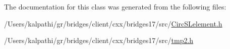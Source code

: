 The documentation for this class was generated from the following files\+:\begin{DoxyCompactItemize}
\item 
/\+Users/kalpathi/gr/bridges/client/cxx/bridges17/src/\mbox{\hyperlink{_circ_s_lelement_8h}{Circ\+S\+Lelement.\+h}}\item 
/\+Users/kalpathi/gr/bridges/client/cxx/bridges17/src/\mbox{\hyperlink{tmp2_8h}{tmp2.\+h}}\end{DoxyCompactItemize}
